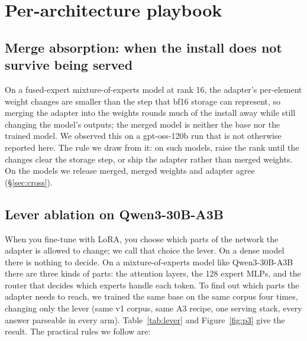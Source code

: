 \section{Per-architecture playbook}
\label{app:playbook}

\subsection{Merge absorption: when the install does not survive being served}
\label{sec:merge}

On a fused-expert mixture-of-experts model at rank 16, the adapter's per-element weight changes are
smaller than the step that bf16 storage can represent, so merging the adapter into the weights
rounds much of the install away while still changing the model's outputs; the merged model is
neither the base nor the trained model. We observed this on a gpt-oss-120b run that is not
otherwise reported here. The rule we draw from it: on such models, raise the rank until the changes
clear the storage step, or ship the adapter rather than merged weights. On the models we release
merged, merged weights and adapter agree (\S\ref{sec:cross}).

\subsection{Lever ablation on Qwen3-30B-A3B}
\label{sec:lever}

When you fine-tune with LoRA, you choose which parts of the network the adapter is allowed to
change; we call that choice the lever. On a dense model there is nothing to decide. On a
mixture-of-experts model like Qwen3-30B-A3B there are three kinds of parts: the attention layers,
the 128 expert MLPs, and the router that decides which experts handle each token. To find out which
parts the adapter needs to reach, we trained the same base on the same corpus four times, changing
only the lever (same v1 corpus, same A3 recipe, one serving stack, every answer parseable in every
arm). Table~\ref{tab:lever} and Figure~\ref{fig:p3} give the result. The practical rules we follow are:

